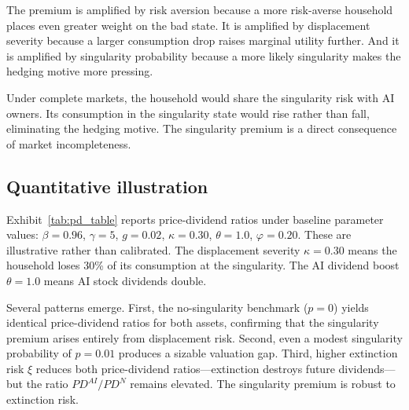 \documentclass[12pt]{article}
\begin{document}
The premium is amplified by risk aversion because a more risk-averse household places even greater weight on the bad state. It is amplified by displacement severity because a larger consumption drop raises marginal utility further. And it is amplified by singularity probability because a more likely singularity makes the hedging motive more pressing.

Under complete markets, the household would share the singularity risk with AI owners. Its consumption in the singularity state would rise rather than fall, eliminating the hedging motive. The singularity premium is a direct consequence of market incompleteness.

\subsection{Quantitative illustration}

Exhibit~\ref{tab:pd_table} reports price-dividend ratios under baseline parameter values: $\beta = 0.96$, $\gamma = 5$, $g = 0.02$, $\kappa = 0.30$, $\theta = 1.0$, $\varphi = 0.20$. These are illustrative rather than calibrated. The displacement severity $\kappa = 0.30$ means the household loses 30\% of its consumption at the singularity. The AI dividend boost $\theta = 1.0$ means AI stock dividends double.

\begin{table}[t]
  \centering
  \caption{Price-dividend ratios under the baseline model. $p$ is the annual singularity probability, $\xi$ is the extinction probability conditional on singularity. $PD^{AI}$ and $PD^{N}$ are the pre-singularity price-dividend ratios of AI stocks and non-AI stocks. Ratio is $PD^{AI}/PD^{N}$. Baseline parameters: $\beta = 0.96$, $\gamma = 5$, $g = 0.02$, $\kappa = 0.30$, $\theta = 1.0$, $\varphi = 0.20$.}
  \label{tab:pd_table} %
  
\end{table}

Several patterns emerge. First, the no-singularity benchmark ($p = 0$) yields identical price-dividend ratios for both assets, confirming that the singularity premium arises entirely from displacement risk. Second, even a modest singularity probability of $p = 0.01$ produces a sizable valuation gap. Third, higher extinction risk $\xi$ reduces both price-dividend ratios---extinction destroys future dividends---but the ratio $PD^{AI}/PD^{N}$ remains elevated. The singularity premium is robust to extinction risk.
\end{document}
